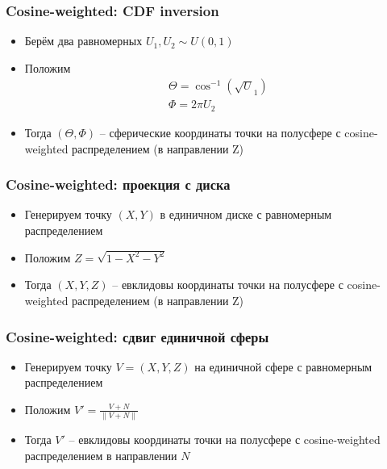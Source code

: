 \documentclass[10pt]{beamer}
\begin{document}
\begin{frame}
\frametitle{Cosine-weighted: CDF inversion}
\begin{itemize}
\item Берём два равномерных \begin{math}U_1,U_2 \sim U(0,1)\end{math}
\pause
\item Положим
\begin{gather*}
\Theta = \cos^{-1}(\sqrt U_1) \\
\Phi = 2\pi U_2
\end{gather*}
\pause
\item Тогда \begin{math}(\Theta,\Phi)\end{math} -- сферические координаты точки на полусфере с cosine-weighted распределением (в направлении Z)
\end{itemize}
\end{frame}

\begin{frame}
\frametitle{Cosine-weighted: проекция с диска}
\begin{itemize}
\item Генерируем точку \begin{math}(X,Y)\end{math} в единичном диске с равномерным распределением
\pause
\item Положим \begin{math}Z = \sqrt{1 - X^2 - Y^2}\end{math}
\pause
\item Тогда \begin{math}(X,Y,Z)\end{math} -- евклидовы координаты точки на полусфере с cosine-weighted распределением (в направлении Z)
\end{itemize}
\end{frame}

\begin{frame}
\frametitle{Cosine-weighted: сдвиг единичной сферы}
\begin{itemize}
\item Генерируем точку \begin{math}V = (X,Y,Z)\end{math} на единичной сфере с равномерным распределением
\pause
\item Положим \begin{math}V' = \frac{V + N}{\|V + N\|}\end{math}
\pause
\item Тогда \begin{math}V'\end{math} -- евклидовы координаты точки на полусфере с cosine-weighted распределением в направлении \begin{math}N\end{math}
\end{itemize}
\end{frame}
\end{document}
